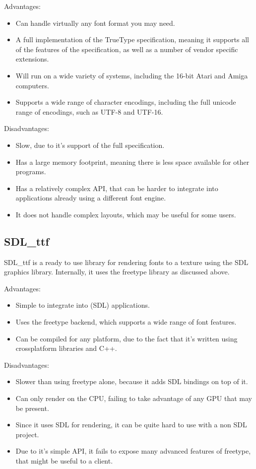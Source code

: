 \documentclass{report}
\begin{document}
Advantages:
\begin{itemize}
\item{Can handle virtually any font format you may need.}
\item{A full implementation of the TrueType specification, meaning it supports
    all of the features of the specification, as well as a number of vendor
    specific extensions.}
\item{Will run on a wide variety of systems, including the 16-bit Atari and
    Amiga computers.}
\item{Supports a wide range of character encodings, including the full unicode
    range of encodings, such as UTF-8 and UTF-16.}
\end{itemize}

Disadvantages:
\begin{itemize}
\item{Slow, due to it's support of the full specification.}
\item{Has a large memory footprint, meaning there is less space available for
    other programs.}
\item{Has a relatively complex API, that can be harder to integrate into
    applications already using a different font engine.}
\item{It does not handle complex layouts, which may be useful for some users.}
\end{itemize}

\subsection{SDL\_ttf}
SDL\_ttf is a ready to use library for rendering fonts to a texture using the
SDL graphics library. Internally, it uses the freetype library as discussed above.

Advantages:
\begin{itemize}
\item{Simple to integrate into (SDL) applications.}
\item{Uses the freetype backend, which supports a wide range of font features.}
\item{Can be compiled for any platform, due to the fact that it's written
    using crossplatform libraries and C++.}    
\end{itemize}

Disadvantages:
\begin{itemize}
\item{Slower than using freetype alone, because it adds SDL bindings on top of
    it.}
\item{Can only render on the CPU, failing to take advantage of any GPU that may
    be present.}
\item{Since it uses SDL for rendering, it can be quite hard to use with a non
    SDL project.}
\item{Due to it's simple API, it fails to expose many advanced features of
    freetype, that might be useful to a client.}
\end{itemize}
\end{document}
